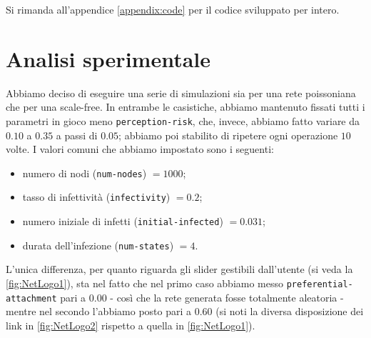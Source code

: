 Si rimanda all'appendice \ref{appendix:code} per il codice sviluppato per intero.
\section{Analisi sperimentale}
Abbiamo deciso di eseguire una serie di simulazioni sia per una rete poissoniana che per una scale-free. In entrambe le casistiche, abbiamo mantenuto fissati tutti i parametri in gioco meno \texttt{perception-risk}, che, invece, abbiamo fatto variare da $ 0.10 $ a $ 0.35 $ a passi di $ 0.05 $; abbiamo poi stabilito di ripetere ogni operazione $ 10 $ volte. I valori comuni che abbiamo impostato sono i seguenti:
\begin{itemize}
\item numero di nodi (\texttt{num-nodes}) $ = 1000 $;
\item tasso di infettività (\texttt{infectivity}) $ = 0.2 $;
\item numero iniziale di infetti (\texttt{initial-infected}) $ = 0.031 $;
\item durata dell'infezione (\texttt{num-states}) $ = 4 $.
\end{itemize}
%
L'unica differenza, per quanto riguarda gli slider gestibili dall'utente (si veda la \cref{fig:NetLogo1}), sta nel fatto che nel primo caso abbiamo messo \texttt{preferential-attachment} pari a $ 0.00 $  - così che la rete generata fosse totalmente aleatoria - mentre nel secondo l'abbiamo posto pari a $ 0.60 $ (si noti la diversa disposizione dei link in \cref{fig:NetLogo2} rispetto a quella in \cref{fig:NetLogo1}).
